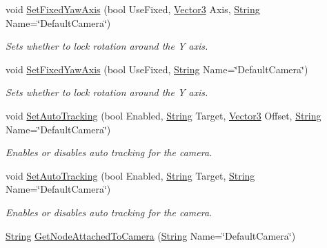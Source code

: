 \begin{DoxyCompactItemize}
void \hyperlink{classphys_1_1CameraManager_ac29a1b3cd34ff2810bee170aa233c77e}{SetFixedYawAxis} (bool UseFixed, \hyperlink{classphys_1_1Vector3}{Vector3} Axis, \hyperlink{namespacephys_aa03900411993de7fbfec4789bc1d392e}{String} Name=\char`\"{}DefaultCamera\char`\"{})
\begin{DoxyCompactList}\small\item\em Sets whether to lock rotation around the Y axis. \item\end{DoxyCompactList}\item 
void \hyperlink{classphys_1_1CameraManager_aa7370f2239e88ab151b72c4171afea07}{SetFixedYawAxis} (bool UseFixed, \hyperlink{namespacephys_aa03900411993de7fbfec4789bc1d392e}{String} Name=\char`\"{}DefaultCamera\char`\"{})
\begin{DoxyCompactList}\small\item\em Sets whether to lock rotation around the Y axis. \item\end{DoxyCompactList}\item 
void \hyperlink{classphys_1_1CameraManager_a43d55c71817096add5dad1552239fc74}{SetAutoTracking} (bool Enabled, \hyperlink{namespacephys_aa03900411993de7fbfec4789bc1d392e}{String} Target, \hyperlink{classphys_1_1Vector3}{Vector3} Offset, \hyperlink{namespacephys_aa03900411993de7fbfec4789bc1d392e}{String} Name=\char`\"{}DefaultCamera\char`\"{})
\begin{DoxyCompactList}\small\item\em Enables or disables auto tracking for the camera. \item\end{DoxyCompactList}\item 
void \hyperlink{classphys_1_1CameraManager_a6edd94b6e8d9f2fa1e0b84554b367933}{SetAutoTracking} (bool Enabled, \hyperlink{namespacephys_aa03900411993de7fbfec4789bc1d392e}{String} Target, \hyperlink{namespacephys_aa03900411993de7fbfec4789bc1d392e}{String} Name=\char`\"{}DefaultCamera\char`\"{})
\begin{DoxyCompactList}\small\item\em Enables or disables auto tracking for the camera. \item\end{DoxyCompactList}\item 
\hyperlink{namespacephys_aa03900411993de7fbfec4789bc1d392e}{String} \hyperlink{classphys_1_1CameraManager_a52a62fcfbeed45a2f527f626731ddcc1}{GetNodeAttachedToCamera} (\hyperlink{namespacephys_aa03900411993de7fbfec4789bc1d392e}{String} Name=\char`\"{}DefaultCamera\char`\"{})

\end{DoxyCompactItemize}
